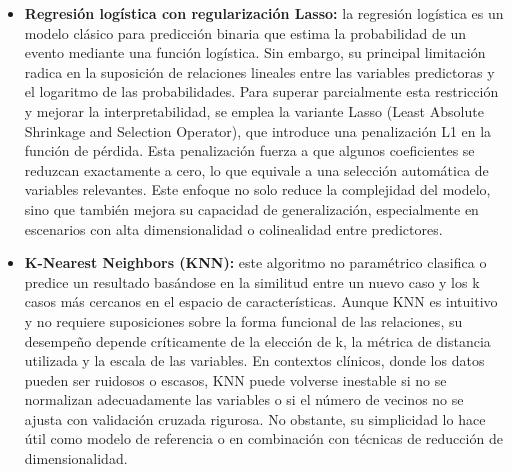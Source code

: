 \begin{itemize}
    \item \textbf{Regresión logística con regularización Lasso:} la regresión logística es un modelo clásico para predicción binaria que estima la probabilidad de un evento mediante una función logística. Sin embargo, su principal limitación radica en la suposición de relaciones lineales entre las variables predictoras y el logaritmo de las probabilidades. Para superar parcialmente esta restricción y mejorar la interpretabilidad, se emplea la variante Lasso (Least Absolute Shrinkage and Selection Operator), que introduce una penalización L1 en la función de pérdida. Esta penalización fuerza a que algunos coeficientes se reduzcan exactamente a cero, lo que equivale a una selección automática de variables relevantes. Este enfoque no solo reduce la complejidad del modelo, sino que también mejora su capacidad de generalización, especialmente en escenarios con alta dimensionalidad o colinealidad entre predictores.

    \item \textbf{K-Nearest Neighbors (KNN):} este algoritmo no paramétrico clasifica o predice un resultado basándose en la similitud entre un nuevo caso y los k casos más cercanos en el espacio de características. Aunque KNN es intuitivo y no requiere suposiciones sobre la forma funcional de las relaciones, su desempeño depende críticamente de la elección de k, la métrica de distancia utilizada y la escala de las variables. En contextos clínicos, donde los datos pueden ser ruidosos o escasos, KNN puede volverse inestable si no se normalizan adecuadamente las variables o si el número de vecinos no se ajusta con validación cruzada rigurosa. No obstante, su simplicidad lo hace útil como modelo de referencia o en combinación con técnicas de reducción de dimensionalidad.


\end{itemize}
